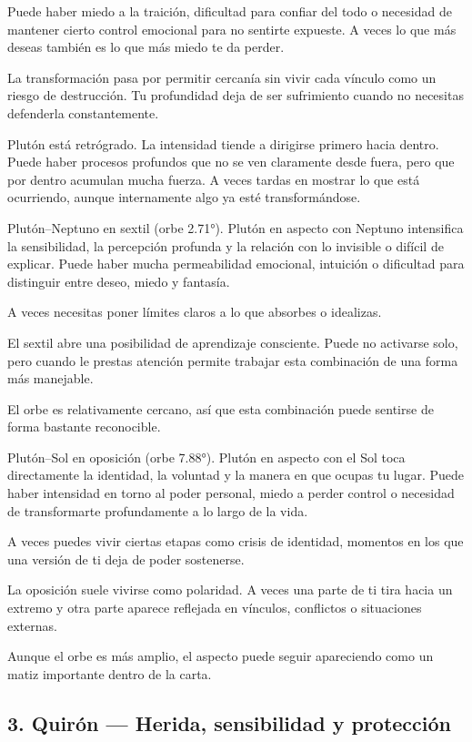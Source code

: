 \documentclass[11pt,a4paper]{article}
\begin{document}
Puede haber miedo a la traición, dificultad para confiar del todo o necesidad de mantener cierto control emocional para no sentirte expueste. A veces lo que más deseas también es lo que más miedo te da perder.

La transformación pasa por permitir cercanía sin vivir cada vínculo como un riesgo de destrucción. Tu profundidad deja de ser sufrimiento cuando no necesitas defenderla constantemente.

Plutón está retrógrado. La intensidad tiende a dirigirse primero hacia dentro. Puede haber procesos profundos que no se ven claramente desde fuera, pero que por dentro acumulan mucha fuerza. A veces tardas en mostrar lo que está ocurriendo, aunque internamente algo ya esté transformándose.

Plutón–Neptuno en sextil (orbe 2.71°).
Plutón en aspecto con Neptuno intensifica la sensibilidad, la percepción profunda y la relación con lo invisible o difícil de explicar. Puede haber mucha permeabilidad emocional, intuición o dificultad para distinguir entre deseo, miedo y fantasía.

A veces necesitas poner límites claros a lo que absorbes o idealizas.

El sextil abre una posibilidad de aprendizaje consciente. Puede no activarse solo, pero cuando le prestas atención permite trabajar esta combinación de una forma más manejable.

El orbe es relativamente cercano, así que esta combinación puede sentirse de forma bastante reconocible.

Plutón–Sol en oposición (orbe 7.88°).
Plutón en aspecto con el Sol toca directamente la identidad, la voluntad y la manera en que ocupas tu lugar. Puede haber intensidad en torno al poder personal, miedo a perder control o necesidad de transformarte profundamente a lo largo de la vida.

A veces puedes vivir ciertas etapas como crisis de identidad, momentos en los que una versión de ti deja de poder sostenerse.

La oposición suele vivirse como polaridad. A veces una parte de ti tira hacia un extremo y otra parte aparece reflejada en vínculos, conflictos o situaciones externas.

Aunque el orbe es más amplio, el aspecto puede seguir apareciendo como un matiz importante dentro de la carta.

\vspace{0.4cm}

\subsection{3. Quirón — Herida, sensibilidad y protección}
\end{document}

